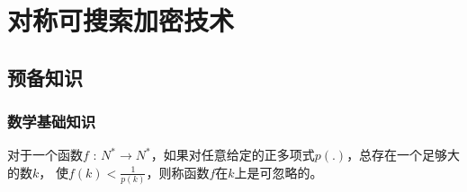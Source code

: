 

\chapter{对称可搜索加密技术} %
\label{chap:search}


\section{预备知识}
\label{sec:search_symm_basic}

\subsection{\textbf{数学基础知识}}
\label{sec:search_symm_math_knowledge}


\begin{defn}
\label{defn:ignore_function}

对于一个函数$f$ : $N^* \rightarrow N^*$，如果对任意给定的正多项式$p(.)$，总存在一个足够大的数$k$，
使$f(k) < \frac{1}{p(k)}$，则称函数$f$在$k$上是可忽略的。

\end{defn}


